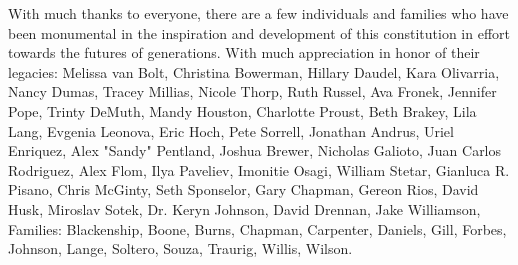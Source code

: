 \documentclass[12pt]{amsart}
\theoremstyle{plain}
\begin{document}
With much thanks to everyone, there are a few individuals and families who have been monumental in the inspiration and development of this constitution in effort towards the futures of generations. With much appreciation in honor of their legacies: Melissa van Bolt, Christina Bowerman, Hillary Daudel, Kara Olivarria, Nancy Dumas, Tracey Millias, Nicole Thorp, Ruth Russel, Ava Fronek, Jennifer Pope, Trinty DeMuth, Mandy Houston, Charlotte Proust, Beth Brakey, Lila Lang, Evgenia Leonova, Eric Hoch, Pete Sorrell, Jonathan Andrus, Uriel Enriquez, Alex "Sandy" Pentland, Joshua Brewer, Nicholas Galioto, Juan Carlos Rodriguez, Alex Flom, Ilya Paveliev, Imonitie Osagi, William Stetar, Gianluca R. Pisano, Chris McGinty, Seth Sponselor, Gary Chapman, Gereon Rios, David Husk, Miroslav Sotek, Dr. Keryn Johnson, David Drennan, Jake Williamson,  Families: Blackenship, Boone, Burns, Chapman, Carpenter, Daniels, Gill, Forbes, Johnson, Lange, Soltero, Souza, Traurig, Willis, Wilson. 



\clearpage
\end{document}

